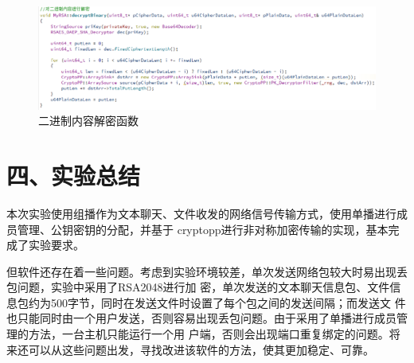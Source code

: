 \documentclass[UTF8]{ctexart}
\begin{document}
\begin{figure}[H]
\includegraphics[width=\textwidth]{pic/binarydecrypt.PNG}
\caption{二进制内容解密函数}
\end{figure}

\section*{四、实验总结}
本次实验使用组播作为文本聊天、文件收发的网络信号传输方式，使用单播进行成员管理、公钥密钥的分配，并基于
cryptopp进行非对称加密传输的实现，基本完成了实验要求。

但软件还存在着一些问题。考虑到实验环境较差，单次发送网络包较大时易出现丢包问题，实验中采用了RSA2048进行加
密，单次发送的文本聊天信息包、文件信息包约为500字节，同时在发送文件时设置了每个包之间的发送间隔；而发送文
件也只能同时由一个用户发送，否则容易出现丢包问题。由于采用了单播进行成员管理的方法，一台主机只能运行一个用
户端，否则会出现端口重复绑定的问题。将来还可以从这些问题出发，寻找改进该软件的方法，使其更加稳定、可靠。
\end{document}
